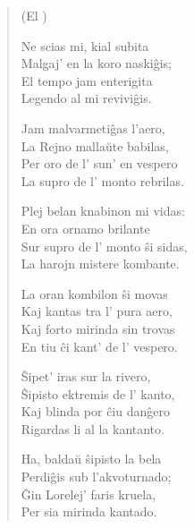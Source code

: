 \begin{verse}
\begin{center}
\footnotesize (El )
\end{center}

                     Ne scias mi, kial subita\\
                     Malgaj' en la koro naski\^gis;\\
                     El tempo jam enterigita\\
                     Legendo al mi revivi\^gis.

                      \vin  Jam malvarmeti\^gas l'aero,\\
                      \vin  La Rejno malla\u ute babilas,\\
                      \vin  Per oro de l' sun' en vespero\\
                      \vin  La supro de l' monto rebrilas.

                     Plej belan knabinon mi vidas:\\
                     En ora ornamo brilante\\
                     Sur supro de l' monto \^si sidas,\\
                     La harojn mistere kombante.

                     \vin   La oran kombilon \^si movas\\
                     \vin   Kaj kantas tra l' pura aero,\\
                     \vin   Kaj forto mirinda sin trovas\\
                     \vin   En tiu \^ci kant' de l' vespero.

                     \^Sipet' iras sur la rivero,\\
                     \^Sipisto ektremis de l' kanto,\\
                     Kaj blinda por \^ciu dan\^gero\\
                     Rigardas li al la kantanto.

                      \vin  Ha, balda\u u \^sipisto la bela\\
                      \vin  Perdi\^gis sub l'akvoturnado;\\
                      \vin  \^Gin Lorelej' faris kruela,\\
                      \vin  Per sia mirinda kantado.

\end{verse}


\smallrule{}
